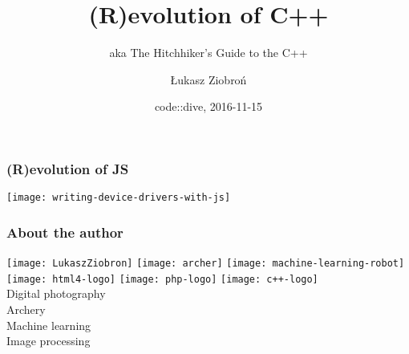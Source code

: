 \author{Łukasz Ziobroń}
\title[Crisis]{(R)evolution of C++}
\date{code::dive, 2016-11-15}
\subject{Computer Science}
\subtitle{aka The Hitchhiker's Guide to the C++}

\begin{frame}
\titlepage
\end{frame}

\begin{frame}
  \frametitle{(R)evolution of JS}
  \centering 
  \texttt{[image: writing-device-drivers-with-js]}
\end{frame}

\begin{frame}
  \frametitle{About the author}
  \texttt{[image: LukaszZiobron]}
  \texttt{[image: archer]}
  \texttt{[image: machine-learning-robot]} \\
  \texttt{[image: html4-logo]}
  \texttt{[image: php-logo]}
  \texttt{[image: c++-logo]} \\
  Digital photography \\
  Archery \\
  Machine learning \\
  Image processing \\
\end{frame}













